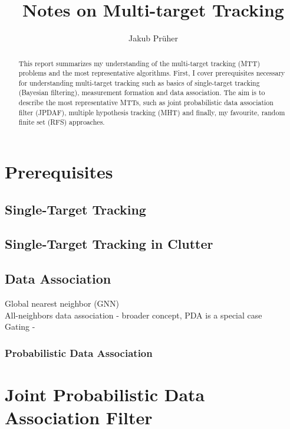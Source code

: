 \documentclass[a4paper]{scrreprt}
\title{Notes on Multi-target Tracking}
\author{Jakub Prüher}
\theoremstyle{theorem}
\theoremstyle{definition}
\begin{document}
\maketitle

\begin{abstract}
	This report summarizes my understanding of the multi-target tracking (MTT) problems and the most representative algorithms. 
	First, I cover prerequisites necessary for understanding multi-target tracking such as basics of single-target tracking (Bayesian filtering), measurement formation and data association.
	The aim is to describe the most representative MTTs, such as joint probabilistic data association filter (JPDAF), multiple hypothesis tracking (MHT) and finally, my favourite, random finite set (RFS) approaches.
\end{abstract}




\chapter{Prerequisites}\label{ch:prerequisites}


\section{Single-Target Tracking}\label{sec:single-target_tracking}


\section{Single-Target Tracking in Clutter}\label{sec:single-target_tracking_in_clutter}


\section{Data Association}\label{sec:data_association}
Global nearest neighbor (GNN)\\
All-neighbors data association - broader concept, PDA is a special case\\
Gating - 

\subsection{Probabilistic Data Association}




\chapter{Joint Probabilistic Data Association Filter}\label{ch:jpda_filter}
\end{document}
